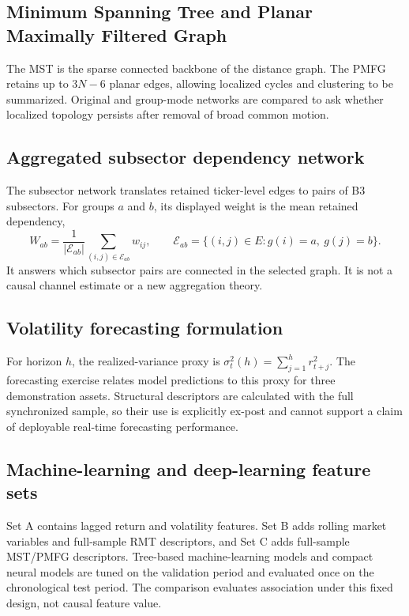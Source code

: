 \subsection{Minimum Spanning Tree and Planar Maximally Filtered Graph}
\label{subsec:network_method}

The MST is the sparse connected backbone of the distance graph. The PMFG retains up to $3N-6$ planar edges, allowing localized cycles and clustering to be summarized. Original and group-mode networks are compared to ask whether localized topology persists after removal of broad common motion.

\subsection{Aggregated subsector dependency network}
\label{subsec:subsector_network_method}

The subsector network translates retained ticker-level edges to pairs of B3 subsectors. For groups $a$ and $b$, its displayed weight is the mean retained dependency,
\begin{equation}
W_{ab}=\frac{1}{|\mathcal{E}_{ab}|}\sum_{(i,j)\in\mathcal{E}_{ab}}w_{ij},
\qquad \mathcal{E}_{ab}=\{(i,j)\in E:g(i)=a,\ g(j)=b\}.
\end{equation}
It answers which subsector pairs are connected in the selected graph. It is not a causal channel estimate or a new aggregation theory.

\subsection{Volatility forecasting formulation}
\label{subsec:forecast_formulation}

For horizon $h$, the realized-variance proxy is $\sigma^2_t(h)=\sum_{j=1}^{h}r_{t+j}^2$. The forecasting exercise relates model predictions to this proxy for three demonstration assets. Structural descriptors are calculated with the full synchronized sample, so their use is explicitly ex-post and cannot support a claim of deployable real-time forecasting performance.

\subsection{Machine-learning and deep-learning feature sets}
\label{subsec:feature_sets}

Set A contains lagged return and volatility features. Set B adds rolling market variables and full-sample RMT descriptors, and Set C adds full-sample MST/PMFG descriptors. Tree-based machine-learning models and compact neural models are tuned on the validation period and evaluated once on the chronological test period. The comparison evaluates association under this fixed design, not causal feature value.

